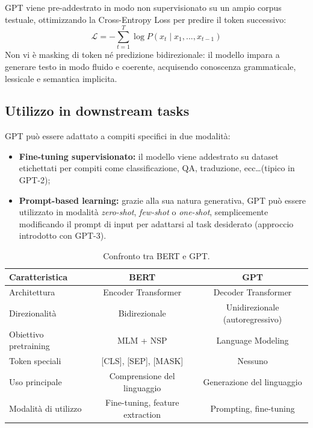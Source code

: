 GPT viene pre-addestrato in modo non supervisionato su un ampio corpus testuale, ottimizzando la Cross-Entropy Loss per predire il token successivo:
\[
\mathcal{L} = -\sum_{t=1}^{T} \log P(x_t \mid x_1, ..., x_{t-1})
\]
Non vi è masking di token né predizione bidirezionale: il modello impara a generare testo in modo fluido e coerente, acquisendo conoscenza grammaticale, lessicale e semantica implicita.

\subsection{Utilizzo in downstream tasks}

GPT può essere adattato a compiti specifici in due modalità:

\begin{itemize}
    \item \textbf{Fine-tuning supervisionato:} il modello viene addestrato su dataset etichettati per compiti come classificazione, QA, traduzione, ecc\ldots (tipico in GPT-2);
    \item \textbf{Prompt-based learning:} grazie alla sua natura generativa, GPT può essere utilizzato in modalità \textit{zero-shot}, \textit{few-shot} o \textit{one-shot}, semplicemente modificando il prompt di input per adattarsi al task desiderato (approccio introdotto con GPT-3).
\end{itemize}

\begin{table}
    \centering
    \caption{Confronto tra BERT e GPT.}
    \begin{adjustbox}{width=\textwidth}
    \begin{tabular}{|l|c|c|}
    \hline
    \textbf{Caratteristica} & \textbf{BERT} & \textbf{GPT} \\
    \hline
    Architettura & Encoder Transformer & Decoder Transformer \\
    Direzionalità & Bidirezionale & Unidirezionale (autoregressivo) \\
    Obiettivo pretraining & MLM + NSP & Language Modeling \\
    Token speciali & [CLS], [SEP], [MASK] & Nessuno \\
    Uso principale & Comprensione del linguaggio & Generazione del linguaggio \\
    Modalità di utilizzo & Fine-tuning, feature extraction & Prompting, fine-tuning \\
    \hline
    \end{tabular}
    \end{adjustbox}
\end{table}
